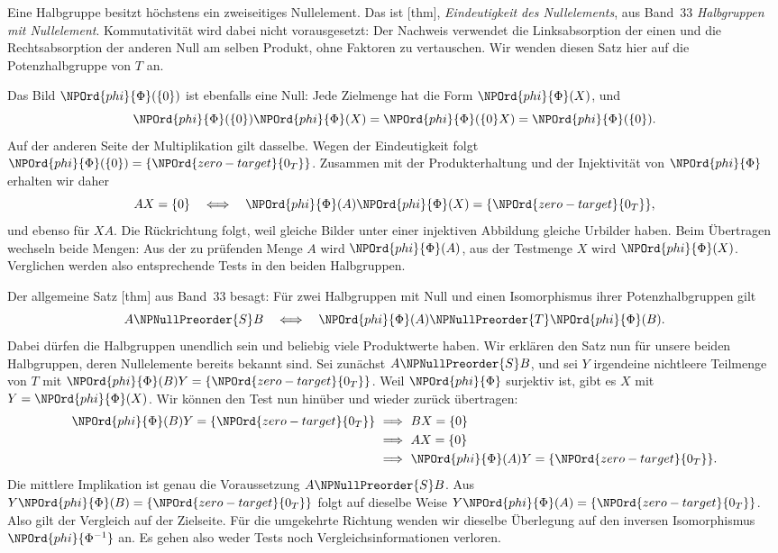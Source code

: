 Eine Halbgruppe besitzt höchstens ein zweiseitiges Nullelement.
Das ist [thm],
\emph{Eindeutigkeit des Nullelements}, aus Band~33
\emph{Halbgruppen mit Nullelement}.
Kommutativität wird dabei nicht vorausgesetzt: Der Nachweis
verwendet die Linksabsorption der einen und die Rechtsabsorption
der anderen Null am selben Produkt, ohne Faktoren zu vertauschen.
Wir wenden diesen Satz hier auf die Potenzhalbgruppe von \(T\) an.

Das Bild \(\NPOrd{phi}{\Phi}(\{0\})\) ist ebenfalls eine Null: Jede Zielmenge
hat die Form \(\NPOrd{phi}{\Phi}(X)\), und
\[
 \NPOrd{phi}{\Phi}(\{0\})\NPOrd{phi}{\Phi}(X)=\NPOrd{phi}{\Phi}(\{0\}X)=\NPOrd{phi}{\Phi}(\{0\}).
\]
Auf der anderen Seite der Multiplikation gilt dasselbe.
Wegen der Eindeutigkeit folgt \(\NPOrd{phi}{\Phi}(\{0\})=\{\NPOrd{zero-target}{0_T}\}\).
Zusammen mit der Produkterhaltung und der Injektivität von \(\NPOrd{phi}{\Phi}\)
erhalten wir daher
\[
 AX=\{0\}\quad\Longleftrightarrow\quad
 \NPOrd{phi}{\Phi}(A)\NPOrd{phi}{\Phi}(X)=\{\NPOrd{zero-target}{0_T}\},
\]
und ebenso für \(XA\). Die Rückrichtung folgt, weil gleiche Bilder
unter einer injektiven Abbildung gleiche Urbilder haben.
Beim Übertragen wechseln beide Mengen: Aus der zu prüfenden Menge
\(A\) wird \(\NPOrd{phi}{\Phi}(A)\), aus der Testmenge \(X\) wird \(\NPOrd{phi}{\Phi}(X)\).
Verglichen werden also entsprechende Tests in den beiden Halbgruppen.

Der allgemeine Satz [thm]
aus Band~33 besagt: Für zwei Halbgruppen mit Null und einen
Isomorphismus ihrer Potenzhalbgruppen gilt
\[
 A\NPNullPreorder{S} B\quad\Longleftrightarrow\quad
 \NPOrd{phi}{\Phi}(A)\NPNullPreorder{T}\NPOrd{phi}{\Phi}(B).
\]
Dabei dürfen die Halbgruppen unendlich sein und beliebig viele
Produktwerte haben. Wir erklären den Satz nun für unsere beiden
Halbgruppen, deren Nullelemente bereits bekannt sind.
Sei zunächst \(A\NPNullPreorder{S} B\), und sei \(Y\) irgendeine nichtleere
Teilmenge von \(T\) mit \(\NPOrd{phi}{\Phi}(B)Y=\{\NPOrd{zero-target}{0_T}\}\). Weil \(\NPOrd{phi}{\Phi}\)
surjektiv ist, gibt es \(X\) mit \(Y=\NPOrd{phi}{\Phi}(X)\). Wir können den
Test nun hinüber und wieder zurück übertragen:
\[
 \begin{aligned}
 \NPOrd{phi}{\Phi}(B)Y=\{\NPOrd{zero-target}{0_T}\}
 &\ \Longrightarrow\ BX=\{0\}\\
 &\ \Longrightarrow\ AX=\{0\}\\
 &\ \Longrightarrow\ \NPOrd{phi}{\Phi}(A)Y=\{\NPOrd{zero-target}{0_T}\}.
 \end{aligned}
\]
Die mittlere Implikation ist genau die Voraussetzung \(A\NPNullPreorder{S} B\).
Aus \(Y\NPOrd{phi}{\Phi}(B)=\{\NPOrd{zero-target}{0_T}\}\) folgt auf dieselbe Weise
\(Y\NPOrd{phi}{\Phi}(A)=\{\NPOrd{zero-target}{0_T}\}\). Also gilt der Vergleich auf der Zielseite.
Für die umgekehrte Richtung wenden wir dieselbe Überlegung auf
den inversen Isomorphismus \(\NPOrd{phi}{\Phi^{-1}}\) an. Es gehen also weder
Tests noch Vergleichsinformationen verloren.

